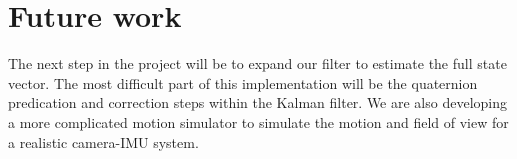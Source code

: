 \documentclass[letterpaper]{article}
\begin{document}

\section{Future work}
The next step in the project will be to expand our filter to estimate the full state vector. The most difficult part of this implementation will be the quaternion predication and correction steps within the Kalman filter. We are also developing a more complicated motion simulator to simulate the motion and field of view for a realistic camera-IMU system.




\end{document}
